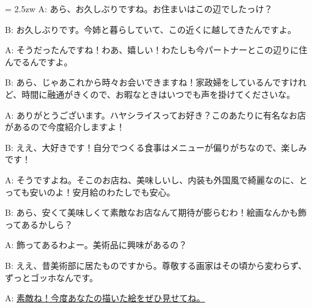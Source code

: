 \documentclass[11pt]{amsart}
\title{}
\author{}
\newenvironment{hangall}[1]{\hangindent = 2.5zw\everypar{\hangindent = 2.5zw}}{}
\begin{document}
\maketitle
\begin{hangall}{}%
A: あら、お久しぶりですね。お住まいはこの辺でしたっけ？

B: お久しぶりです。今姉と暮らしていて、この近くに越してきたんですよ。

A: そうだったんですね！わあ、嬉しい！わたしも今パートナーとこの辺りに住んでるんですよ。

B: あら、じゃあこれから時々お会いできますね！家政婦をしているんですけれど、時間に融通がきくので、お暇なときはいつでも声を掛けてくださいな。

A: ありがとうございます。ハヤシライスってお好き？このあたりに有名なお店があるので今度紹介しますよ！

B: ええ、大好きです！自分でつくる食事はメニューが偏りがちなので、楽しみです！

A: そうですよね。そこのお店ね、美味しいし、内装も外国風で綺麗なのに、とっても安いのよ！安月給のわたしでも安心。

B: あら、安くて美味しくて素敵なお店なんて期待が膨らむわ！絵画なんかも飾ってあるかしら？

A: 飾ってあるわよー。美術品に興味があるの？

B: ええ、昔美術部に居たものですから。尊敬する画家はその頃から変わらず、ずっとゴッホなんです。

A: \ul{素敵ね！今度あなたの描いた絵をぜひ見せてね。}\end{hangall}
\end{document}
